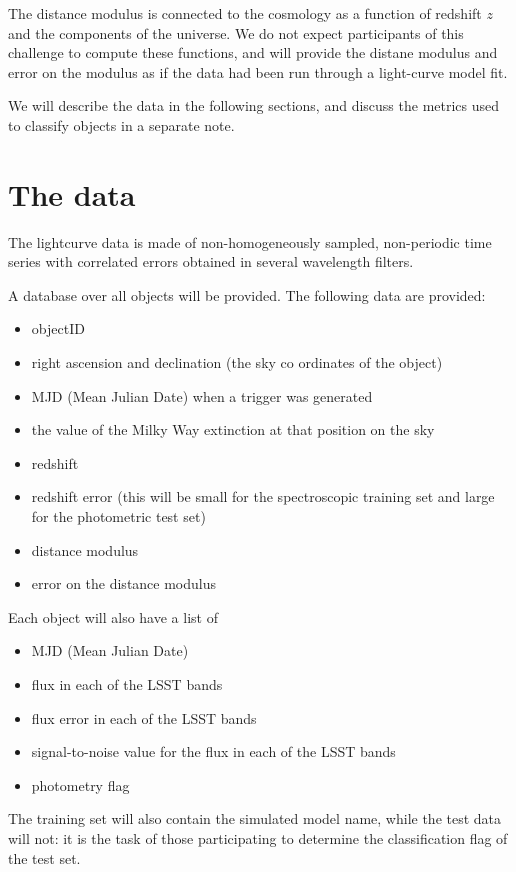 \documentclass[\docopts]{\docclass}
\begin{document}
The distance modulus is connected to the cosmology as a function of redshift $z$ and the components of the universe. We do not expect participants of this challenge to compute these functions, and will provide the distane modulus and error on the modulus as if the data had been run through a light-curve model fit.

We will describe the data in the following sections, and discuss the metrics used to classify objects in a separate note.
\section{The data}
\label{sec:thedata}
The lightcurve data is made of non-homogeneously sampled, non-periodic time series with correlated errors obtained in several wavelength filters.

A database over all objects will be provided. The following data are provided:

\begin{itemize}
\item objectID
\item right ascension and declination (the sky co ordinates of the object)
\item MJD (Mean Julian Date) when a trigger was generated
\item the value of the Milky Way extinction at that position on the sky
\item redshift
\item redshift error (this will be small for the spectroscopic training set and large for the photometric test set)
\item distance modulus
\item error on the distance modulus
\end{itemize}

Each object will also have a list of

\begin{itemize}
\item MJD (Mean Julian Date)
\item flux in each of the LSST bands
\item flux error in each of the LSST bands
\item signal-to-noise value for the flux in each of the LSST bands
\item photometry flag 
\end{itemize}


The training set will also contain the simulated model name, while the test data will not: it is the task of those participating to determine the classification flag of the test set.
\end{document}
